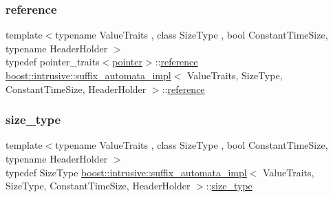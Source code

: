 \subsubsection{\texorpdfstring{reference}{reference}}
{\footnotesize\ttfamily template$<$typename Value\+Traits , class Size\+Type , bool Constant\+Time\+Size, typename Header\+Holder $>$ \\
typedef pointer\+\_\+traits$<$\hyperlink{classboost_1_1intrusive_1_1suffix__automata__impl_aa30039fa797b95a84660985ab506f6ef}{pointer}$>$\+::\hyperlink{classboost_1_1intrusive_1_1suffix__automata__impl_a65352a440751b963521c55774953f0e4}{reference} \hyperlink{classboost_1_1intrusive_1_1suffix__automata__impl}{boost\+::intrusive\+::suffix\+\_\+automata\+\_\+impl}$<$ Value\+Traits, Size\+Type, Constant\+Time\+Size, Header\+Holder $>$\+::\hyperlink{classboost_1_1intrusive_1_1suffix__automata__impl_a65352a440751b963521c55774953f0e4}{reference}}

\mbox{\label{classboost_1_1intrusive_1_1suffix__automata__impl_ad2fe9bd542f914c94c7d0e42cce5613c}} 
\subsubsection{\texorpdfstring{size\+\_\+type}{size\_type}}
{\footnotesize\ttfamily template$<$typename Value\+Traits , class Size\+Type , bool Constant\+Time\+Size, typename Header\+Holder $>$ \\
typedef Size\+Type \hyperlink{classboost_1_1intrusive_1_1suffix__automata__impl}{boost\+::intrusive\+::suffix\+\_\+automata\+\_\+impl}$<$ Value\+Traits, Size\+Type, Constant\+Time\+Size, Header\+Holder $>$\+::\hyperlink{classboost_1_1intrusive_1_1suffix__automata__impl_ad2fe9bd542f914c94c7d0e42cce5613c}{size\+\_\+type}}

\mbox{\label{classboost_1_1intrusive_1_1suffix__automata__impl_abbf3dee8caf18613db903931801c6076}} 
